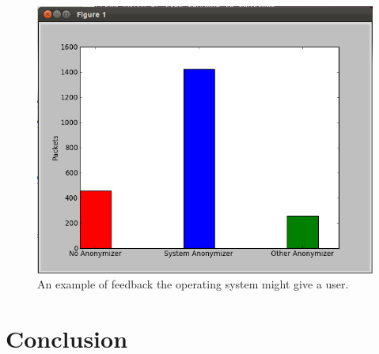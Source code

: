 \documentclass{article}
\begin{document}
\begin{figure}
\centering
\includegraphics[scale=0.5]{images/feedback.png}
\caption{An example of feedback the operating system might give a user.}
\label{fig:feedback}
\end{figure}


\section{Conclusion}
\label{conclusion}


{}

\end{document}
